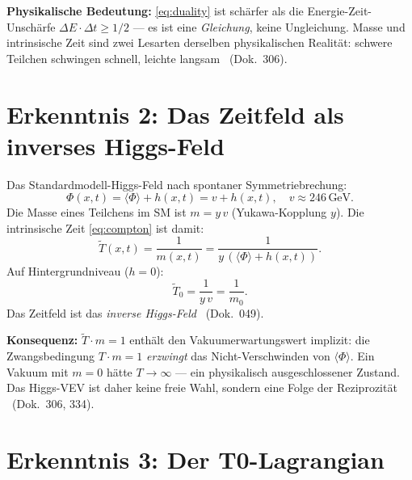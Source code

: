 \textbf{Physikalische Bedeutung:} \eqref{eq:duality} ist schärfer als die
Energie-Zeit-Unschärfe $\Delta E \cdot \Delta t \geq 1/2$ --- es ist eine
\emph{Gleichung}, keine Ungleichung. Masse und intrinsische Zeit sind zwei
Lesarten derselben physikalischen Realität: schwere Teilchen schwingen schnell,
leichte langsam \BM\ (Dok.~306).

\section{Erkenntnis 2: Das Zeitfeld als inverses Higgs-Feld}

Das Standardmodell-Higgs-Feld nach spontaner Symmetriebrechung:
\begin{equation}
  \Phi(x,t) = \langle\Phi\rangle + h(x,t) = v + h(x,t),
  \quad v \approx 246\,\text{GeV}.
  \label{eq:higgs_field}
\end{equation}
Die Masse eines Teilchens im SM ist $m = y\,v$ (Yukawa-Kopplung $y$).
Die intrinsische Zeit \eqref{eq:compton} ist damit:
\begin{equation}
  \tilde{T}(x,t) = \frac{1}{m(x,t)} = \frac{1}{y\,(\langle\Phi\rangle + h(x,t))}.
  \label{eq:T_from_higgs}
\end{equation}
Auf Hintergrundniveau ($h = 0$):
\begin{equation}
  \boxed{\tilde{T}_0 = \frac{1}{y\,v} = \frac{1}{m_0}.}
\end{equation}
Das Zeitfeld ist das \emph{inverse Higgs-Feld} \BM\ (Dok.~049).

\textbf{Konsequenz:} $\tilde{T}\cdot m = 1$ enthält den Vakuumerwartungswert
implizit: die Zwangsbedingung $T\cdot m = 1$ \emph{erzwingt} das Nicht-Verschwinden
von $\langle\Phi\rangle$. Ein Vakuum mit $m = 0$ hätte $T \to \infty$ --- ein
physikalisch ausgeschlossener Zustand. Das Higgs-VEV ist daher keine freie
Wahl, sondern eine Folge der Reziprozität \BM\ (Dok.~306, 334).

\section{Erkenntnis 3: Der T0-Lagrangian}

